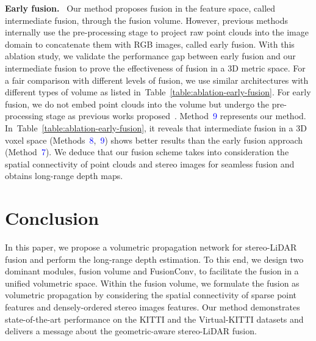 \documentclass[letterpaper, 10 pt, conference]{ieeeconf}
\newcommand{\Tref}[1]{Table~\textcolor{blue}{\ref{#1}}}
\begin{document}
\noindent \textbf{Early fusion.} \
Our method proposes fusion in the feature space, called intermediate fusion, through the fusion volume. However, previous methods~\cite{stereolidar_01,stereolidar_00,stereolidar_norm_costV_ccvn} internally use the pre-processing stage to project raw point clouds  into the image domain to concatenate them with RGB images, called early fusion. With this ablation study, we validate the performance gap between early fusion and our intermediate fusion to prove the effectiveness of fusion in a 3D metric space. For a fair comparison with different levels of fusion, we use similar architectures with different types of volume as listed in~\Tref{table:ablation-early-fusion}. For early fusion, we do not embed point clouds into the volume but undergo the pre-processing stage as previous works proposed~\cite{stereolidar_01,stereolidar_00,stereolidar_norm_costV_ccvn}. Method~\textcolor{blue}{9} represents our method. In~\Tref{table:ablation-early-fusion}, it reveals that intermediate fusion in a 3D voxel space (Methods~\textcolor{blue}{8},~\textcolor{blue}{9}) shows better results than the early fusion approach (Method~\textcolor{blue}{7}). We deduce that our fusion scheme takes into consideration the spatial connectivity of point clouds and stereo images for seamless fusion and obtains long-range depth maps.


\vspace{-1mm}
\section{Conclusion}
\label{sec:Conclusion}
In this paper, we propose a volumetric propagation network for stereo-LiDAR fusion and perform the long-range depth estimation. To this end, we design two dominant modules, fusion volume and FusionConv, to facilitate the fusion in a unified volumetric space. Within the fusion volume, we formulate the fusion as volumetric propagation by considering the spatial connectivity of sparse point features and densely-ordered stereo images features. Our method demonstrates state-of-the-art performance on the KITTI and the Virtual-KITTI datasets and delivers a message about the geometric-aware stereo-LiDAR fusion.










\newpage


\renewcommand*{\thesection}{\Alph{section}}
\end{document}
